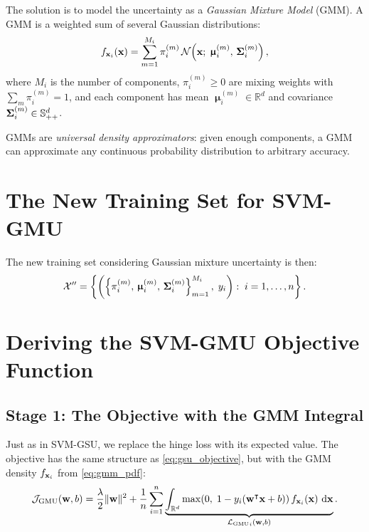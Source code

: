 \documentclass[11pt, letterpaper]{article}
\newcommand{\bSigma}{\vb{\Sigma}}
\newcommand{\bmu}{\boldsymbol{\upmu}}
\newcommand{\R}{\mathbb{R}}
\newcommand{\setX}{\mathcal{X}}
\newcommand{\loss}{\mathcal{L}}
\newcommand{\obj}{\mathcal{J}}
\newcommand{\Norm}{\mathcal{N}}
\begin{document}
The solution is to model the uncertainty as a \emph{Gaussian Mixture Model} (GMM). A GMM is a weighted sum of several Gaussian distributions:
\begin{equation}\label{eq:gmm_pdf}
    f_{\vb{x}_i}(\vb{x}) = \sum_{m=1}^{M_i} \pi_i^{(m)}\, \Norm\!\left(\vb{x};\; \bmu_i^{(m)},\, \bSigma_i^{(m)}\right),
\end{equation}
where $M_i$ is the number of components, $\pi_i^{(m)} \geq 0$ are mixing weights with $\sum_m \pi_i^{(m)} = 1$, and each component has mean $\bmu_i^{(m)} \in \R^d$ and covariance $\bSigma_i^{(m)} \in \mathbb{S}^d_{++}$.

GMMs are \emph{universal density approximators}: given enough components, a GMM can approximate any continuous probability distribution to arbitrary accuracy.

\section{The New Training Set for SVM-GMU}\label{sec:gmu_training_set}

The new training set considering Gaussian mixture uncertainty is then:
\begin{equation}\label{eq:gmu_training_set}
    \setX'' = \left\{ \left(\left\{\pi_i^{(m)},\, \bmu_i^{(m)},\, \bSigma_i^{(m)}\right\}_{m=1}^{M_i},\; y_i\right) :\; i = 1, \ldots, n \right\}.
\end{equation}

\section{Deriving the SVM-GMU Objective Function}\label{sec:gmu_objective}

\subsection{Stage 1: The Objective with the GMM Integral}

Just as in SVM-GSU, we replace the hinge loss with its expected value. The objective has the same structure as \cref{eq:gsu_objective}, but with the GMM density $f_{\vb{x}_i}$ from \cref{eq:gmm_pdf}:
\begin{equation}\label{eq:gmu_obj_integral}
    \obj_{\text{GMU}}(\vb{w}, b) = \frac{\lambda}{2}\|\vb{w}\|^2 + \frac{1}{n}\sum_{i=1}^{n} \underbrace{\int_{\R^d} \max\!\left(0,\; 1 - y_i\!\left(\vb{w}^{\intercal} \vb{x} + b\right)\right) f_{\vb{x}_i}(\vb{x})\, \dd{\vb{x}}}_{{\loss_{\text{GMU}}}_{i}(\vb{w}, b)}.
\end{equation}
\end{document}
